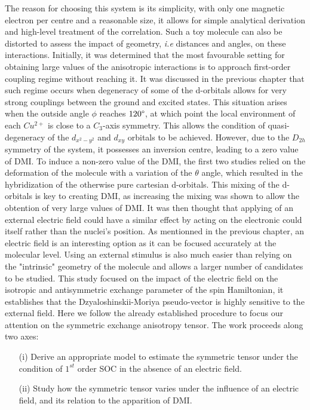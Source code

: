 \documentclass[12pt]{report}
\numberwithin{equation}{section}
\begin{document}
The reason for choosing this system is its simplicity, with only one magnetic electron per centre and a reasonable size, it allows for simple analytical derivation and high-level treatment of the correlation.
Such a toy molecule can also be distorted to assess the impact of geometry, \textit{i.e} distances and angles, on these interactions.
Initially, it was determined that the most favourable setting for obtaining large values of the anisotropic interactions is to approach first-order coupling regime without reaching it.
It was discussed in the previous chapter that such regime occurs when degeneracy of some of the d-orbitals allows for very strong couplings between the ground and excited states.
This situation arises when the outside angle $\phi$ reaches $120 \degree$, at which point the local environment of each $Cu^{2+}$ is close to a $C_3$-axis symmetry.
This allows the condition of quasi-degeneracy of the $d_{x^2-y^2}$ and $d_{xy}$ orbitals to be achieved. However, due to the $D_{2h}$ symmetry of the system, it possesses an inversion centre, leading to a zero value of DMI.
To induce a non-zero value of the DMI, the first two studies relied on the deformation of the molecule with a variation of the $\theta$ angle, which resulted in the hybridization of the otherwise pure cartesian d-orbitals.
This mixing of the d-orbitals is key to creating DMI, as increasing the mixing was shown to allow the obtention of very large values of DMI.
It was then thought that applying of an external electric field could have a similar effect by acting on the electronic could itself rather than the nuclei's position.
As mentionned in the previous chapter, an electric field is an interesting option as it can be focused accurately at the molecular level. 
Using an external stimulus is also much easier than relying on the "intrinsic" geometry of the molecule and allows a larger number of candidates to be studied.
This study focused on the impact of the electric field on the isotropic and antisymmetric exchange parameter of the spin Hamiltonian, it establishes that the Dzyaloshinskii-Moriya pseudo-vector is highly sensitive to the external field.
Here we follow the already established procedure to focus our attention on the symmetric exchange anisotropy tensor.
The work proceeds along two axes:
\begin{itemize}
    \item[(i)] Derive an appropriate model to estimate the symmetric tensor under the condition of $1^{st}$ order SOC in the absence of an electric field.
    \item[(ii)] Study how the symmetric tensor varies under the influence of an electric field, and its relation to the apparition of DMI.
\end{itemize}
\end{document}
